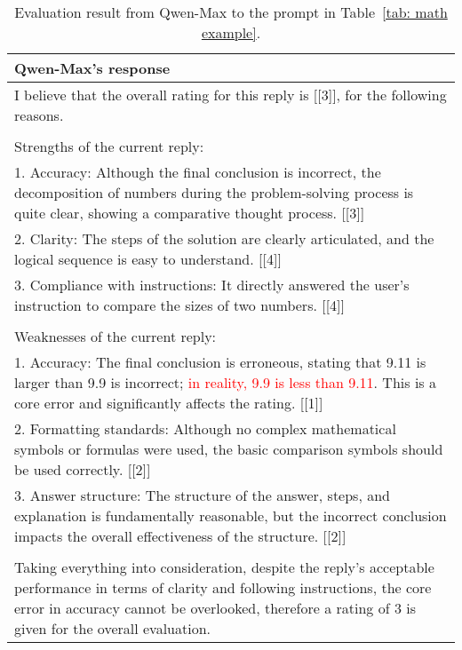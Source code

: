 \begin{table*}[tbh!]
  \caption{Evaluation result from Qwen-Max to the prompt in Table~\ref{tab: math example}.}
  \label{tab: qwenmax's response}
  \small
  \begin{tabularx}{\textwidth}{X}
    \toprule
        Qwen-Max's response \\ \midrule

        I believe that the overall rating for this reply is [[3]], for the following reasons.\\
        \\
        Strengths of the current reply:\\
        1. Accuracy: Although the final conclusion is incorrect, the decomposition of numbers during the problem-solving process is quite clear, showing a comparative thought process. [[3]]\\
        2. Clarity: The steps of the solution are clearly articulated, and the logical sequence is easy to understand. [[4]]\\
        3. Compliance with instructions: It directly answered the user's instruction to compare the sizes of two numbers. [[4]]\\
        \\
        Weaknesses of the current reply:\\
        1. Accuracy: The final conclusion is erroneous, stating that 9.11 is larger than 9.9 is incorrect; \textcolor{red}{in reality, 9.9 is less than 9.11}. This is a core error and significantly affects the rating. [[1]]\\
        2. Formatting standards: Although no complex mathematical symbols or formulas were used, the basic comparison symbols should be used correctly. [[2]]\\
        3. Answer structure: The structure of the answer, steps, and explanation is fundamentally reasonable, but the incorrect conclusion impacts the overall effectiveness of the structure. [[2]]\\
        \\
        Taking everything into consideration, despite the reply’s acceptable performance in terms of clarity and following instructions, the core error in accuracy cannot be overlooked, therefore a rating of 3 is given for the overall evaluation.\\
    \bottomrule
  \end{tabularx}
\end{table*}


